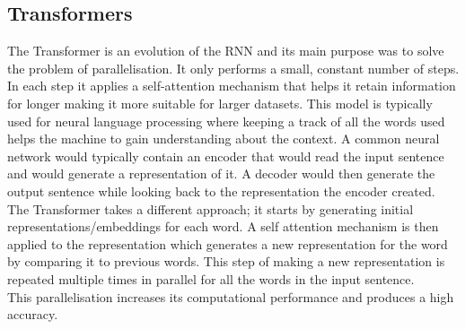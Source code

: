 \documentclass{article}
\begin{document}
\subsection{Transformers}
The Transformer is an evolution of the RNN and its main purpose was to solve the problem of
parallelisation. It only performs a small, constant number of steps. In each step it applies a
self-attention mechanism that helps it retain information for longer making it more suitable for
larger datasets. This model is typically used for neural language processing where keeping a
track of all the words used helps the machine to gain understanding about the context. A
common neural network would typically contain an encoder that would read the input sentence
and would generate a representation of it. A decoder would then generate the output sentence
while looking back to the representation the encoder created. The Transformer takes a different
approach; it starts by generating initial representations/embeddings for each word. A self
attention mechanism is then applied to the representation which generates a new representation
for the word by comparing it to previous words. This step of making a new representation is
repeated multiple times in parallel for all the words in the input sentence.\\
This parallelisation increases its computational performance and produces a high accuracy.
\end{document}
